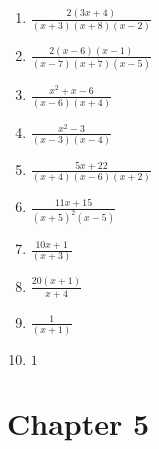 \documentclass[a4paper]{JAC2003}
\begin{document}
\begin{enumerate}
\item $\frac{2(3 x+4)}{(x+3)(x+8)(x-2)}$

\item $\frac{2(x-6)(x-1)}{(x-7)(x+7)(x-5)}$

\item $\frac{x^{2}+x-6}{(x-6)(x+4)}$ %

\item $\frac{x^{2}-3}{(x-3)(x-4)}$

\item $\frac{5 x+22}{(x+4)(x-6)(x+2)}$

\item $\frac{11 x+15}{(x+5)^{2}(x-5)}$

\item $\frac{10 x+1}{(x+3)}$

\item $\frac{20(x+1)}{x+4}$

\item $\frac{1}{(x+1)}$

\item $1$
\end{enumerate}


\section{Chapter 5}
\end{document}

